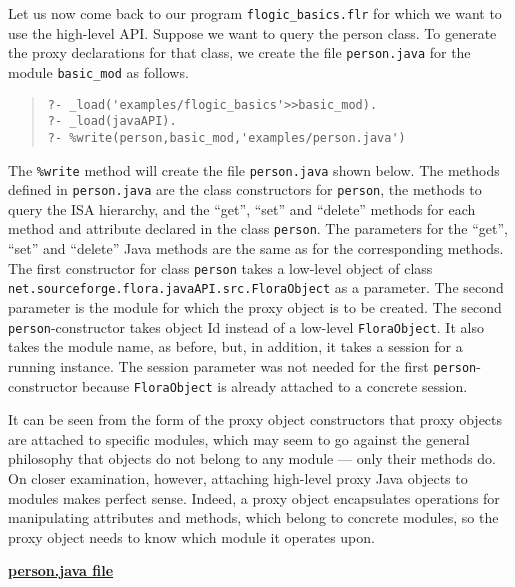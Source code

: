 Let us now come back to our program {\tt flogic\_basics.flr} for which we
want to use the high-level API.  Suppose we want to query the person class.
To generate the proxy declarations for that class, we create
the file {\tt person.java} for the 
module {\tt basic\_mod} as follows.
\begin{quote}
\begin{verbatim}
?- _load('examples/flogic_basics'>>basic_mod).
?- _load(javaAPI).
?- %write(person,basic_mod,'examples/person.java')
\end{verbatim}
\end{quote}


The {\tt \%write} method will create the file {\tt person.java} shown
below.  The methods defined in {\tt person.java} are the class constructors
for {\tt person}, the methods to query the ISA hierarchy, and the ``get'',
``set'' and ``delete'' methods for each method and attribute declared in
the \FLORA class {\tt person}.  The parameters for the ``get'', ``set'' and
``delete'' Java methods are the same as for the corresponding \FLORA
methods. The first constructor for class {\tt person} takes a low-level
object of class {\tt net.sourceforge.flora.javaAPI.src.FloraObject} as a
parameter. The second parameter is the \FLORA module for which the proxy
object is to be created.
The second {\tt person}-constructor takes \fl object Id instead of a
low-level {\tt FloraObject}. It also takes the module name, as before, but,
in addition, it takes a session for a running \FLORA instance.
The session parameter was not needed for the first {\tt person}-constructor
because {\tt FloraObject} is already attached to a concrete session.  

It can be seen from the form of the proxy object constructors that
proxy objects are attached to specific \FLORA modules, which may seem to
go against the general philosophy that \fl objects do not belong to any
module --- only their methods do. On closer examination, however, attaching
high-level proxy Java objects to modules makes perfect sense. Indeed, a
proxy object encapsulates operations for manipulating \fl attributes 
and methods, which belong to concrete \FLORA modules, so the proxy object
needs to know which module it operates upon.


\underline{{\bf person.java file}}

